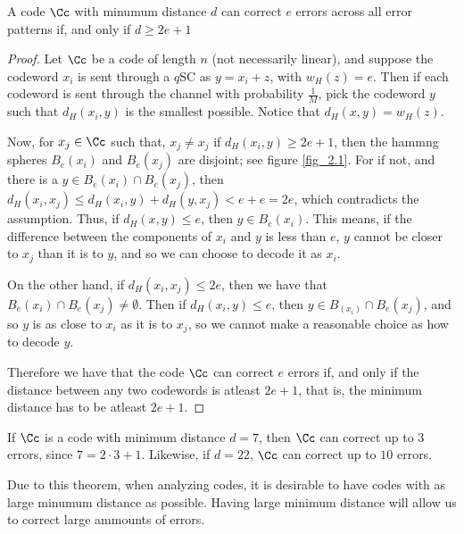 \begin{theorem}\label{2.3.2}
    A code $\Cc$ with minumum distance $d$ can correct $e$ errors across all
    error patterns if, and only if $d \geq 2e+1$
\end{theorem}
\begin{proof}
    Let $\Cc$ be a code of length  $n$  (not necessarily linear), and suppose
    the codeword $x_i$ is sent through a  $q$SC as $y=x_i+z$, with  $w_H(z)=e$.
    Then if each codeword is sent through the channel with probability
    $\frac{1}{M}$, pick the codeword $y$ such that  $d_H(x_i,y)$ is the smallest
    possible. Notice that $d_H(x,y)=w_H(z)$.

    Now, for $x_j \in \Cc$ such that, $x_j \neq x_j$ if $d_H(x_i,y) \geq 2e+1$,
    then the hammng spheres $B_e(x_i)$ and $B_e(x_j)$ are disjoint; see
    figure \ref{fig_2.1}. For if not, and there is a $y \in B_e(x_i) \cap
    B_e(x_j)$, then $d_H(x_i,x_j) \leq d_H(x_i,y)+d_H(y,x_j)<e+e=2e$, which
    contradicts the assumption. Thus, if $d_H(x,y) \leq e$, then $y \in
    B_e(x_i)$. This means, if the difference between the components of $x_i$ and
    $y$ is less than $e$, $y$ cannot be closer to  $x_j$ than it is to  $y$, and
    so we can choose to decode it as  $x_i$.

    On the other hand, if  $d_H(x_i,x_j) \leq 2e$, then we have that $B_e(x_i)
    \cap B_e(x_j) \neq \emptyset$. Then if $d_H(x_i,y) \leq e$, then $y \in
    B_(x_i) \cap B_e(x_j)$, and so $y$ is as close to $x_i$ as it is to $x_j$,
    so we cannot make a reasonable choice as how to decode  $y$.

    Therefore we have that the code  $\Cc$ can correct  $e$ errors if, and only
    if the distance between any two codewords is atleast  $2e+1$, that is, the
    minimum distance has to be atleast  $2e+1$.
\end{proof}

\begin{example}
    If $\Cc$ is a code with minimum distance  $d=7$, then  $\Cc$ can correct up
    to  $3$ errors, since  $7=2 \cdot 3+1$. Likewise, if  $d=22$,  $\Cc$ can
    correct up to  $10$ errors.
\end{example}

\begin{remark}
    Due to this theorem, when analyzing codes, it is desirable to have codes
    with as large minumum distance as possible. Having large minimum distance
    will allow us to correct large ammounts of errors.
\end{remark}

